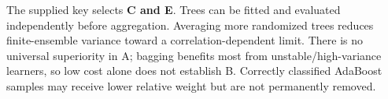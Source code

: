 The supplied key selects \textbf{C and E}. Trees can be fitted and evaluated independently before aggregation. Averaging more randomized trees reduces finite-ensemble variance toward a correlation-dependent limit. There is no universal superiority in A; bagging benefits most from unstable/high-variance learners, so low cost alone does not establish B. Correctly classified AdaBoost samples may receive lower relative weight but are not permanently removed.
